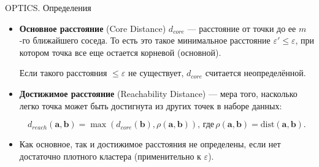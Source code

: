 \documentclass[unicode, notheorems, handout]{beamer}
\begin{document}
\begin{frame}{OPTICS. Определения}

\begin{itemize}
   \item \textbf{Основное расстояние} (Core Distance) $d_{core}$ --- расстояние от точки до ее $m$-го ближайшего соседа. То есть это такое минимальное расстояние $\varepsilon' \leqslant \varepsilon$, при котором точка все еще остается корневой (основной). 
   \vspace{1ex}
   
   Если такого расстояния $\leqslant \varepsilon$ не существует, $d_{core}$ считается неопределённой.

   \item \textbf{Достижимое расстояние} (Reachability Distance) --- мера того, насколько легко точка может быть достигнута из других точек в наборе данных:
\vspace{-2.5ex}

   $$d_{reach}(\pmb{a}, \pmb{b}) = \max ( d_{core} (\pmb b), \rho(\pmb a, \pmb b)),\, \text{где}\, \rho(\pmb a, \pmb b) = \text{dist}(\pmb a, \pmb b). $$    


   \item    Как основное, так и достижимое расстояния не определены, если нет достаточно плотного кластера (применительно к $\varepsilon$). 
\end{itemize}
\end{frame}
\end{document}
